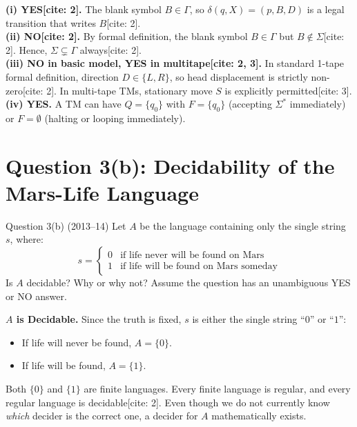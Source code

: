 \documentclass[11pt,a4paper]{article}
\begin{document}
\begin{solutionbox}
\textbf{(i) YES[cite: 2].} The blank symbol $B \in \Gamma$, so $\delta(q, X) = (p, B, D)$ is a legal transition that writes $B$[cite: 2]. \\
\textbf{(ii) NO[cite: 2].} By formal definition, the blank symbol $B \in \Gamma$ but $B \notin \Sigma$[cite: 2]. Hence, $\Sigma \subsetneq \Gamma$ always[cite: 2]. \\
\textbf{(iii) NO in basic model, YES in multitape[cite: 2, 3].} In standard 1-tape formal definition, direction $D \in \{L, R\}$, so head displacement is strictly non-zero[cite: 2]. In multi-tape TMs, stationary move $S$ is explicitly permitted[cite: 3]. \\
\textbf{(iv) YES.} A TM can have $Q = \{q_0\}$ with $F = \{q_0\}$ (accepting $\Sigma^*$ immediately) or $F = \emptyset$ (halting or looping immediately).
\end{solutionbox}

\section{Question 3(b): Decidability of the Mars-Life Language}
\begin{questionbox}{Question 3(b) (2013--14)}
Let $A$ be the language containing only the single string $s$, where:
$$s = \begin{cases} 0 & \text{if life never will be found on Mars} \\ 1 & \text{if life will be found on Mars someday} \end{cases}$$
Is $A$ decidable? Why or why not? Assume the question has an unambiguous YES or NO answer.
\end{questionbox}

\begin{solutionbox}
\textbf{$A$ is Decidable.}
Since the truth is fixed, $s$ is either the single string ``$0$'' or ``$1$'':
\begin{itemize}[leftmargin=*]
    \item If life will never be found, $A = \{0\}$.
    \item If life will be found, $A = \{1\}$.
\end{itemize}
Both $\{0\}$ and $\{1\}$ are finite languages. Every finite language is regular, and every regular language is decidable[cite: 2]. Even though we do not currently know \textit{which} decider is the correct one, a decider for $A$ mathematically exists.
\end{solutionbox}
\end{document}
